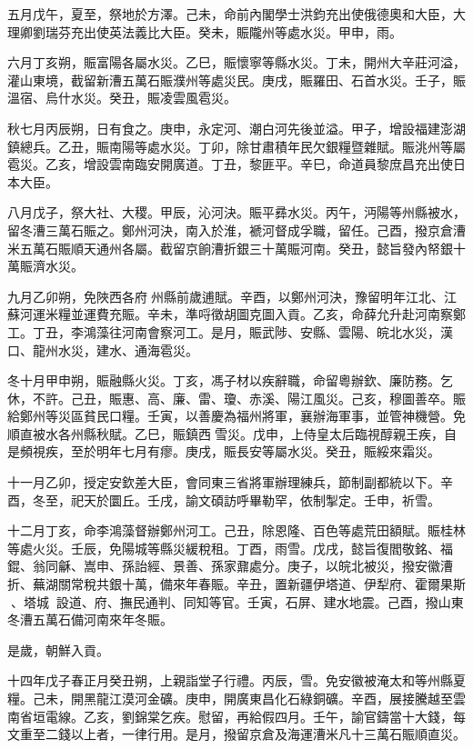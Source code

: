 \begin{pinyinscope}
五月戊午，夏至，祭地於方澤。己未，命前內閣學士洪鈞充出使俄德奧和大臣，大理卿劉瑞芬充出使英法義比大臣。癸未，賑隴州等處水災。甲申，雨。

六月丁亥朔，賑富陽各屬水災。乙巳，賑懷寧等縣水災。丁未，開州大辛莊河溢，灌山東境，截留新漕五萬石賑濮州等處災民。庚戌，賑羅田、石首水災。壬子，賑溫宿、烏什水災。癸丑，賑凌雲風雹災。

秋七月丙辰朔，日有食之。庚申，永定河、潮白河先後並溢。甲子，增設福建澎湖鎮總兵。乙丑，賑南陽等處水災。丁卯，除甘肅積年民欠銀糧暨雜賦。賑洮州等屬雹災。乙亥，增設雲南臨安開廣道。丁丑，黎匪平。辛巳，命道員黎庶昌充出使日本大臣。

八月戊子，祭大社、大稷。甲辰，沁河決。賑平彞水災。丙午，沔陽等州縣被水，留冬漕三萬石賑之。鄭州河決，南入於淮，褫河督成孚職，留任。己酉，撥京倉漕米五萬石賑順天通州各屬。截留京餉漕折銀三十萬賑河南。癸丑，懿旨發內帑銀十萬賑濟水災。

九月乙卯朔，免陜西各府州縣前歲逋賦。辛酉，以鄭州河決，豫留明年江北、江蘇河運米糧並運費充賑。辛未，準哷徵胡圖克圖入貢。乙亥，命薛允升赴河南察鄭工。丁丑，李鴻藻往河南會察河工。是月，賑武陟、安縣、雲陽、皖北水災，漢口、龍州水災，建水、通海雹災。

冬十月甲申朔，賑融縣火災。丁亥，馮子材以疾辭職，命留粵辦欽、廉防務。乞休，不許。己丑，賑惠、高、廉、雷、瓊、赤溪、陽江風災。己亥，穆圖善卒。賑給鄭州等災區貧民口糧。壬寅，以善慶為福州將軍，襄辦海軍事，並管神機營。免順直被水各州縣秋賦。乙巳，賑鎮西雪災。戊申，上侍皇太后臨視醇親王疾，自是頻視疾，至於明年七月有瘳。庚戌，賑長安等屬水災。癸丑，賑綏來霜災。

十一月乙卯，授定安欽差大臣，會同東三省將軍辦理練兵，節制副都統以下。辛酉，冬至，祀天於圜丘。壬戌，諭文碩訪呼畢勒罕，依制掣定。壬申，祈雪。

十二月丁亥，命李鴻藻督辦鄭州河工。己丑，除恩隆、百色等處荒田額賦。賑桂林等處火災。壬辰，免陽城等縣災緩稅租。丁酉，雨雪。戊戌，懿旨復閻敬銘、福錕、翁同龢、嵩申、孫詒經、景善、孫家鼐處分。庚子，以皖北被災，撥安徽漕折、蕪湖關常稅共銀十萬，備來年春賑。辛丑，置新疆伊塔道、伊犁府、霍爾果斯、塔城，設道、府、撫民通判、同知等官。壬寅，石屏、建水地震。己酉，撥山東冬漕五萬石備河南來年冬賑。

是歲，朝鮮入貢。

十四年戊子春正月癸丑朔，上親詣堂子行禮。丙辰，雪。免安徽被淹太和等州縣夏糧。己未，開黑龍江漠河金礦。庚申，開廣東昌化石綠銅礦。辛酉，展接騰越至雲南省垣電線。乙亥，劉錦棠乞疾。慰留，再給假四月。壬午，諭官鑄當十大錢，每文重至二錢以上者，一律行用。是月，撥留京倉及海運漕米凡十三萬石賑順直災。


\end{pinyinscope}
